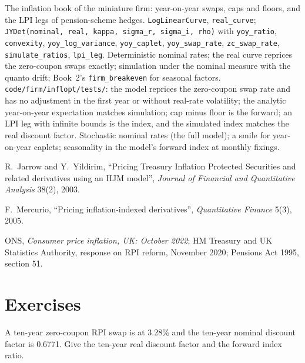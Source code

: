 \begin{build}
 The inflation book of the miniature firm: year-on-year swaps, caps
and floors, and the LPI legs of pension-scheme hedges.
 \texttt{LogLinearCurve}, \texttt{real\_curve};
\texttt{JYDet(nominal, real, kappa, sigma\_r, sigma\_i, rho)} with \texttt{yoy\_ratio},
\texttt{convexity}, \texttt{yoy\_log\_variance}, \texttt{yoy\_caplet},
\texttt{yoy\_swap\_rate}, \texttt{zc\_swap\_rate}, \texttt{simulate\_ratios},
\texttt{lpi\_leg}.
 Deterministic nominal rates; the real curve reprices the zero-coupon
swaps exactly; simulation under the nominal measure with the quanto drift; Book~2's
\texttt{firm\_breakeven} for seasonal factors.
 \texttt{code/firm/inflopt/tests/}: the model reprices the
zero-coupon swap rate and has no adjustment in the first year or without real-rate
volatility; the analytic year-on-year expectation matches simulation; cap minus floor
is the forward; an LPI leg with infinite bounds is the index, and the simulated index
matches the real discount factor.
 Stochastic nominal rates (the full model); a smile for year-on-year
caplets; seasonality in the model's forward index at monthly fixings.
\end{build}

\begin{omsources}
\item R.\ Jarrow and Y.\ Yildirim, ``Pricing Treasury Inflation Protected Securities
and related derivatives using an HJM model'', \emph{Journal of Financial and
Quantitative Analysis} 38(2), 2003.
\item F.\ Mercurio, ``Pricing inflation-indexed derivatives'', \emph{Quantitative
Finance} 5(3), 2005.
\item ONS, \emph{Consumer price inflation, UK: October 2022}; HM Treasury and UK
Statistics Authority, response on RPI reform, November 2020; Pensions Act 1995,
section 51.
\end{omsources}

\section{Exercises}

\begin{exercise}[$\star$]\label{exo:rc:inflation-derivatives:1}
A ten-year zero-coupon RPI swap is at 3.28\% and the ten-year nominal discount factor
is 0.6771. Give the ten-year real discount factor and the forward index ratio.
\end{exercise}

